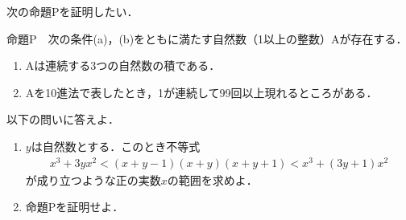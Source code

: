 \documentclass[../../main.tex]{subfiles}
\begin{document}
次の命題Pを証明したい．

命題P　次の条件(a)，(b)をともに満たす自然数（1以上の整数）Aが存在する．
\begin{enumerate}
  \item[(a)] Aは連続する3つの自然数の積である．
  \item[(b)] Aを10進法で表したとき，1が連続して99回以上現れるところがある．
\end{enumerate}
以下の問いに答えよ．
\begin{enumerate}
  \item $y$は自然数とする．このとき不等式
    \begin{align*}
      x^3+3yx^2<(x+y-1)(x+y)(x+y+1)<x^3+(3y+1)x^2
    \end{align*}
    が成り立つような正の実数$x$の範囲を求めよ．
  \item 命題Pを証明せよ．
\end{enumerate}
\end{document}

